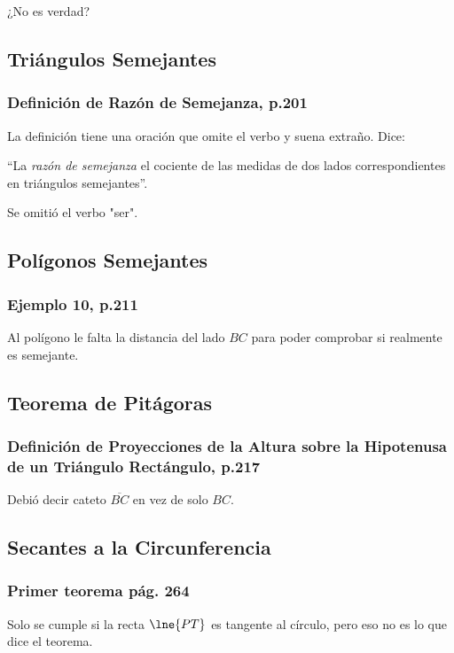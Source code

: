 ¿No es verdad?

\subsection{Triángulos Semejantes}
\subsubsection{Definición de Razón de Semejanza, p.201}

La definición tiene una oración que omite el verbo y suena extraño. Dice:

``La \textit{razón de semejanza} el cociente de las medidas de dos lados correspondientes en triángulos semejantes''.

Se omitió el verbo "ser".

\subsection{Polígonos Semejantes}
\subsubsection{Ejemplo 10, p.211}

Al polígono le falta la distancia del lado \(BC\) para poder comprobar si realmente es semejante.

\subsection{Teorema de Pitágoras}
\subsubsection{Definición de Proyecciones de la Altura sobre la Hipotenusa de un Triángulo Rectángulo, p.217}

Debió decir cateto \(\overline{BC}\) en vez de solo \(BC\).

\subsection{Secantes a la Circunferencia}
\subsubsection{Primer teorema pág. 264}

Solo se cumple si la recta $\lne{PT}$ es tangente al círculo, pero eso no es lo que dice el teorema.

